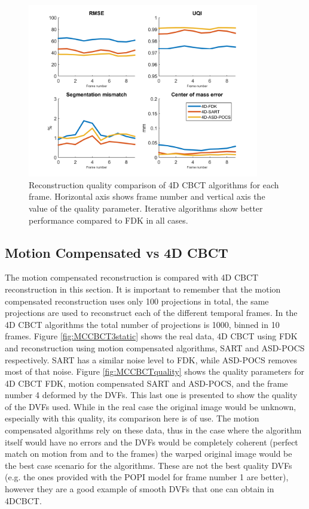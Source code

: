 \begin{figure}
\begin{center}

\includegraphics[width=0.9\textwidth]{accuracyMC/4DCBCTparams.png} 


\end{center}

\caption[Reconstruction quality comparison of 4D CBCT algorithms]{\label{fig:4dCBCTquality} Reconstruction quality comparison of 4D CBCT algorithms for each frame. Horizontal axis shows frame number and vertical axis the value of the quality parameter. Iterative algorithms show better performance compared to FDK in all cases.} 
\end{figure}

\subsection{Motion Compensated vs 4D CBCT}

The motion compensated reconstruction is compared with 4D CBCT reconstruction in this section. It is important to remember that the motion compensated reconstruction uses only 100 projections in total, the same projections are used to reconstruct each of the different temporal frames. In the 4D CBCT algorithms the total number of projections is 1000, binned in 10 frames. Figure \ref{fig:MCCBCT3static} shows the real data, 4D CBCT using FDK and reconstruction using motion compensated algorithms, SART and ASD-POCS respectively. SART has a similar noise level to FDK, while ASD-POCS removes most of that noise. Figure \ref{fig:MCCBCTquality} shows the quality parameters for 4D CBCT FDK, motion compensated SART and ASD-POCS, and the frame number 4 deformed by the DVFs. This last one is presented to show the quality of the DVFs used. While in the real case the original image would be unknown, especially with this quality, its comparison here is of use. The motion compensated algorithms rely on these data, thus in the case where the algorithm itself would have no errors and the DVFs would be completely coherent (perfect match on motion from and to the frames) the warped original image would be the best case scenario for the algorithms. These are not the best quality DVFs (e.g. the ones provided with the POPI model for frame number 1 are better), however they are a good example of smooth DVFs that one can obtain in 4DCBCT.

